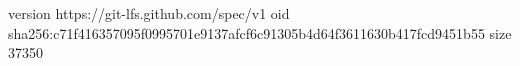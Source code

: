 version https://git-lfs.github.com/spec/v1
oid sha256:c71f416357095f0995701e9137afcf6c91305b4d64f3611630b417fcd9451b55
size 37350
